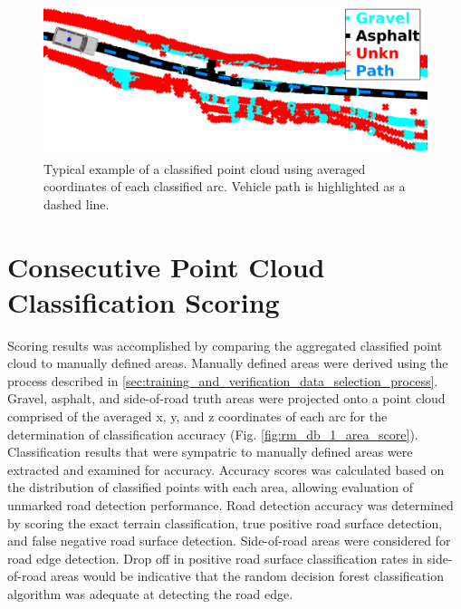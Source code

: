 \documentclass[numbered,pdftex]{ohio-etd}
\begin{document}
{{		\begin{figure}[H]
			\centering
			\includegraphics[width=0.9\linewidth]{Defense_Images/db_1_avg_points_example_withvan}
			\caption[Classified Point Cloud]{Typical example of a classified point cloud using averaged coordinates of each classified arc. Vehicle path is highlighted as a dashed line.}
			\label{fig:raw_classification_results}
		\end{figure}
		
	}
	
	\section{Consecutive Point Cloud Classification Scoring}\label{sec:consecutive_point_cloud_classification_scoring}{
		
		{Scoring results was accomplished by comparing the aggregated classified point cloud to manually defined areas. Manually defined areas were derived using the process described in \ref{sec:training_and_verification_data_selection_process}. Gravel, asphalt, and side-of-road truth areas were projected onto a point cloud comprised of the averaged x, y, and z coordinates of each arc for the determination of classification accuracy (Fig. \ref{fig:rm_db_1_area_score}). Classification results that were sympatric to manually defined areas were extracted and examined for accuracy. Accuracy scores was calculated based on the distribution of classified points with each area, allowing evaluation of unmarked road detection performance. Road detection accuracy was determined by scoring the exact terrain classification, true positive road surface detection, and false negative road surface detection. Side-of-road areas were considered for road edge detection. Drop off in positive road surface classification rates in side-of-road areas would be indicative that the random decision forest classification algorithm was adequate at detecting the road edge.}
		

}}
\end{document}
